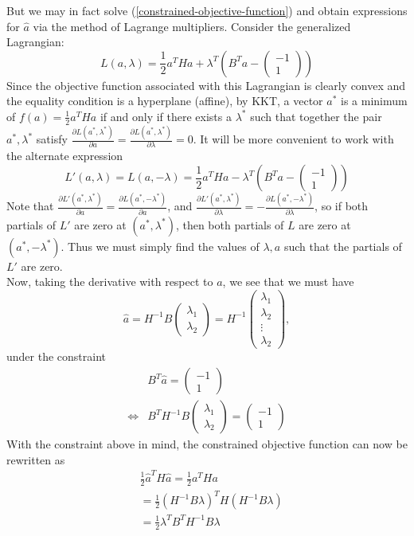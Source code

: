 \documentclass{article}
\theoremstyle{definition}
\theoremstyle{remark}
\numberwithin{equation}{section}
\begin{document}
But we may in fact solve (\ref{constrained-objective-function}) and obtain expressions for $\hat{a}$ via the method of Lagrange multipliers. Consider the generalized Lagrangian: 
\[ L(a,\lambda) = \frac{1}{2} a^T H a + \lambda^T (B^Ta - \begin{pmatrix} -1 \\ 1 \end{pmatrix} ) \]
Since the objective function associated with this Lagrangian is clearly convex and the equality condition is a hyperplane (affine), by KKT, a vector $a^*$ is a minimum of $f(a) = \frac{1}{2} a^T H a$ if and only if there exists a $\lambda^*$ such that together the pair $a^*, \lambda^*$ satisfy $\frac{\partial L(a^*,\lambda^*)}{\partial a} = \frac{\partial L(a^*,\lambda^*)}{\partial \lambda} = 0$. It will be more convenient to work with the alternate expression 
\[ L'(a,\lambda) = L(a,-\lambda) = \frac{1}{2} a^T H a - \lambda^T (B^Ta - \begin{pmatrix} -1 \\ 1 \end{pmatrix} ) \] 
Note that $\frac{\partial L'(a^*,\lambda^*)}{\partial a} = \frac{\partial L(a^*, -\lambda^*)}{\partial a}$, and $\frac{\partial L'(a^*,\lambda^*)}{\partial \lambda} = -\frac{\partial L(a^*, -\lambda^*)}{\partial \lambda}$, so if both partials of $L'$ are zero at $(a^*, \lambda^*)$, then both partials of $L$ are zero at $(a^*, -\lambda^*)$. Thus we must simply find the values of $\lambda, a$ such that the partials of $L'$ are zero. \\

Now, taking the derivative with respect to $a$, we see that we must have 
\[ \hat{a} = H^{-1} B \begin{pmatrix} \lambda_1 \\ \lambda_2 \end{pmatrix} = H^{-1} \begin{pmatrix} \lambda_1 \\ \lambda_2 \\ \vdots \\ \lambda_2 \end{pmatrix},\]
under the constraint 
\begin{align*}
&B^T\hat{a} = \begin{pmatrix} -1 \\ 1 \end{pmatrix} \\
\iff &B^T H^{-1} B \begin{pmatrix}\lambda_1 \\ \lambda_2 \end{pmatrix} = \begin{pmatrix} -1 \\ 1 \end{pmatrix}
\end{align*} With the constraint above in mind, the constrained objective function can now be rewritten as 
\begin{align*}
& \frac{1}{2}\hat{a}^T H \hat{a} = \frac{1}{2}a^T Ha \\
&= \frac{1}{2}(H^{-1}B \lambda)^TH(H^{-1}B \lambda) \\
&= \frac{1}{2} \lambda^T B^T H^{-1}B \lambda
\end{align*}
\end{document}
